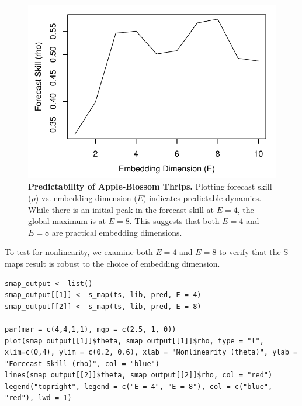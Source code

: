 \begin{figure}[!ht]
\begin{center}\includegraphics[width=\maxwidth{\textwidth}]{fig_redm_14.pdf}\end{center}
\caption[Predictability of Apple-Blossom Thrips.]{\textbf{Predictability of Apple-Blossom Thrips.}\newline
Plotting forecast skill ($\rho$) vs. embedding dimension ($E$) indicates predictable dynamics. While there is an initial peak in the forecast skill at $E = 4$, the global maximum is at $E = 8$. This suggests that both $E = 4$ and $E = 8$ are practical embedding dimensions.}
\end{figure}

To test for nonlinearity, we examine both $E = 4$ and $E = 8$ to verify that the S-maps result is robust to the choice of embedding dimension.

\begin{lstlisting}
smap_output <- list()
smap_output[[1]] <- s_map(ts, lib, pred, E = 4)
smap_output[[2]] <- s_map(ts, lib, pred, E = 8)

par(mar = c(4,4,1,1), mgp = c(2.5, 1, 0))
plot(smap_output[[1]]$theta, smap_output[[1]]$rho, type = "l", xlim=c(0,4), ylim = c(0.2, 0.6), xlab = "Nonlinearity (theta)", ylab = "Forecast Skill (rho)", col = "blue")
lines(smap_output[[2]]$theta, smap_output[[2]]$rho, col = "red")
legend("topright", legend = c("E = 4", "E = 8"), col = c("blue", "red"), lwd = 1)
\end{lstlisting}

